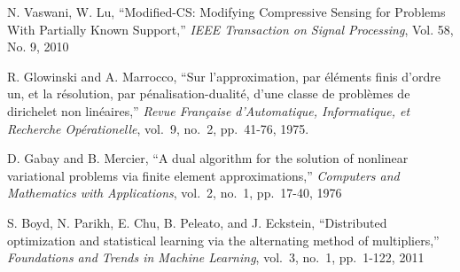\documentclass[letter,10pt]{article}
\theoremstyle{definition}
\theoremstyle{nonumberplain}
\begin{document}
	
	\begin{thebibliography}{9}
	
			N. Vaswani, W. Lu,
			``Modified-CS: Modifying Compressive Sensing for Problems With Partially Known Support,''
			\emph{IEEE Transaction on Signal Processing}, Vol. 58, No. 9,
			2010
		
			R. Glowinski and A. Marrocco,
			``Sur l'approximation, par  \'el\'ements finis d'ordre un, et la r\'esolution, par p\'enalisation-dualit\'e, d'une classe de probl\`emes de dirichelet non lin\'eaires,''
			\emph{Revue Fran\c{c}aise d'Automatique, Informatique, et Recherche Op\'erationelle}, 
			vol.\ 9, no.\ 2, pp.\ 41-76, 1975.
			
			D. Gabay and B. Mercier,
			``A dual algorithm for the solution of nonlinear variational problems via finite element approximations,''
			\emph{Computers and Mathematics with Applications},
			vol.\ 2, no.\ 1, pp.\ 17-40,
			1976
		
			S. Boyd, N. Parikh, E. Chu, B. Peleato, and J. Eckstein,
			``Distributed optimization and statistical learning via the alternating method of multipliers,''
			\emph{Foundations and Trends in Machine Learning}, 
			vol.\ 3, no.\ 1, pp.\ 1-122,
			2011
			
	
	\end{thebibliography}

	
	
\end{document}
